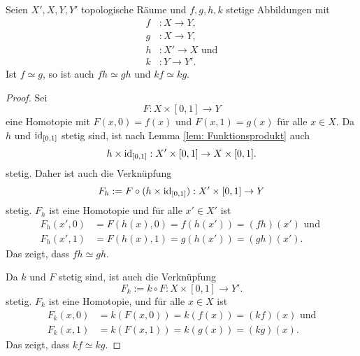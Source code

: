 \documentclass[a4paper,10pt]{article}
\begin{document}
\section{}
\begin{lem}\label{lem: Verknüpfung erhält Homotopie}
 Seien $X', X, Y, Y'$ topologische Räume und $f,g,h,k$ stetige Abbildungen mit
 \begin{align*}
  f &: X \to Y, \\
  g &: X \to Y, \\
  h &: X' \to X \text{ und}\\
  k &: Y \to Y'.
 \end{align*}
 Ist $f \simeq g$, so ist auch $fh \simeq gh$ und $kf \simeq kg$.
\end{lem}
\begin{proof}
 Sei
 \[
  F : X \times [0,1] \to Y
 \]
 eine Homotopie mit $F(x,0) = f(x)$ und $F(x,1) = g(x)$ für alle $x \in X$. Da $h$ und $\operatorname{id}_{[0,1]}$ stetig sind, ist nach Lemma \ref{lem: Funktionsprodukt} auch
 \[
  h \times \operatorname{id}_{[0,1]} : X' \times [0,1] \to X \times [0,1].
 \]
 stetig. Daher ist auch die Verknüpfung
 \[
  F_h := F \circ (h \times \operatorname{id}_{[0,1]}) : X' \times [0,1] \to Y
 \]
 stetig. $F_h$ ist eine Homotopie und für alle $x' \in X'$ ist
 \begin{align*}
  F_h(x',0) &= F(h(x),0) = f(h(x')) = (fh)(x') \text{ und } \\
  F_h(x',1) &= F(h(x),1) = g(h(x')) = (gh)(x').
 \end{align*}
 Das zeigt, dass $fh \simeq gh$.
 
 Da $k$ und $F$ stetig sind, ist auch die Verknüpfung
 \[
  F_k := k \circ F : X \times [0,1] \to Y'. 
 \]
 stetig. $F_k$ ist eine Homotopie, und für alle $x \in X$ ist
 \begin{align*}
  F_k(x,0) &= k(F(x,0)) = k(f(x)) = (kf)(x) \text{ und} \\
  F_k(x,1) &= k(F(x,1)) = k(g(x)) = (kg)(x).
 \end{align*}
 Das zeigt, dass $kf \simeq kg$.
\end{proof}
\end{document}
